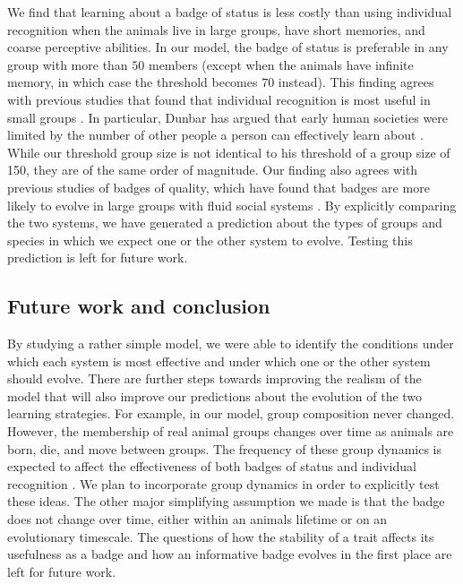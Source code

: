 We find that learning about a badge of status is less costly than using individual recognition when the animals live in large groups, have short memories, and coarse perceptive abilities. In our model, the badge of status is preferable in any group with more than $50$ members (except when the animals have infinite memory, in which case the threshold becomes $70$ instead). This finding agrees with previous studies that found that individual recognition is most useful in small groups \citep{Veiga:1993fk}. In particular, Dunbar has argued that early human societies were limited by the number of other people a person can effectively learn about \citep{Dunbar:1993zr,Hill:2003ly}. While our threshold group size is not identical to his threshold of a group size of 150, they are of the same order of magnitude. Our finding also agrees with previous studies of badges of quality, which have found that badges are more likely to evolve in large groups with fluid social systems \citep{Rohwer:1975fk,Tibbetts:2009kx}. By explicitly comparing the two systems, we have generated a prediction about the types of groups and species in which we expect one or the other system to evolve. Testing this prediction is left for future work. 

 
\subsection*{Future work and conclusion}
 
By studying a rather simple model, we were able to identify the conditions under which each system is most effective and under which one or the other system should evolve. There are further steps towards improving the realism of the model that will also improve our predictions about the evolution of the two learning strategies. For example, in our model, group composition never changed. However, the membership of real animal groups changes over time as animals are born, die, and move between groups. The frequency of these group dynamics is expected to affect the effectiveness of both badges of status \citep{Rohwer:1975fk,Tibbetts:2009kx} and individual recognition \citep{Whitfield:1987tg,Veiga:1993fk}. We plan to incorporate group dynamics in order to explicitly test these ideas. The other major simplifying assumption we made is that the badge does not change over time, either within an animals lifetime or on an evolutionary timescale. The questions of how the stability of a trait affects its usefulness as a badge and how an informative badge evolves in the first place are left for future work.

